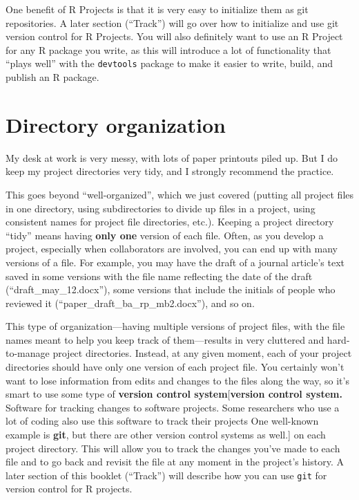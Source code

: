 \documentclass[]{tufte-book}
\begin{document}
One benefit of R Projects is that it is very easy to initialize them as git repositories.
A later section (``Track'') will go over how to initialize and use git version control for
R Projects. You will also definitely want to use an R Project for any R package you write,
as this will introduce a lot of functionality that ``plays well'' with the \texttt{devtools} package
to make it easier to write, build, and publish an R package.

\hypertarget{directory-organization}{%
\section{Directory organization}\label{directory-organization}}

My desk at work is very messy, with lots of paper printouts piled up. But I do
keep my project directories very tidy, and I strongly recommend the practice.

This goes beyond ``well-organized'', which we just covered (putting all project
files in one directory, using subdirectories to divide up files in a project,
using consistent names for project file directories, etc.). Keeping a project
directory ``tidy'' means having \textbf{only one} version of each file. Often, as you
develop a project, especially when collaborators are involved, you can end up
with many versions of a file. For example, you may have the draft of a journal
article's text saved in some versions with the file name reflecting the date of
the draft (``draft\_may\_12.docx''), some versions that include the initials of
people who reviewed it (``paper\_draft\_ba\_rp\_mb2.docx''), and so on.

This type of organization---having multiple versions of project files, with the
file names meant to help you keep track of them---results in very cluttered and
hard-to-manage project directories. Instead, at any given moment, each of your
project directories should have only one version of each project file. You
certainly won't want to lose information from edits and changes to the files
along the way, so it's smart to use some type of \textbf{version control
system}{[}\textbf{version control system.} Software for tracking changes to software
projects. Some researchers who use a lot of coding also use this software to
track their projects One well-known example is \textbf{git}, but there are other
version control systems as well.{]} on each project directory. This will allow you
to track the changes you've made to each file and to go back and revisit the
file at any moment in the project's history. A later section of this booklet
(``Track'') will describe how you can use \texttt{git} for version control for R
projects.
\end{document}
